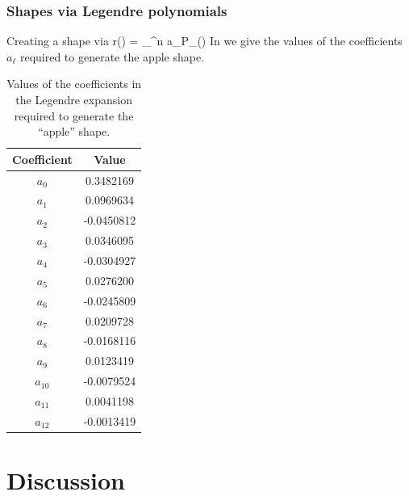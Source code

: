 \documentclass[amsmath,amssymb,12pt,eqsecnum]{revtex4}
\begin{document}
\subsubsection{Shapes via Legendre polynomials}
Creating a shape via
\bea
r(\theta) = \sum_{}^n a_{\ell}P_{\ell}(\cos\theta)
\eea
In  we give the values of the coefficients  $a_{\ell}$ required to generate the apple shape.
\begin{table}[!t]
\label{tab:priors}
\begin{center}
\begin{tabular}{|c|c|}  \hline 
Coefficient & Value \\ \hline 
$a_0$ & 0.3482169\\ \hline  
$a_1$ & 0.0969634 \\ \hline  
$a_2$ & -0.0450812 \\ \hline 
$a_3$ &  0.0346095\\ \hline 
$a_4$ & -0.0304927 \\ \hline  
$a_5$ &  0.0276200\\ \hline 
$a_6$ & -0.0245809\\ \hline 
$a_7$ & 0.0209728\\ \hline 
$a_8$ & -0.0168116\\ \hline  
$a_9$ & 0.0123419\\ \hline  
$a_{10}$ & -0.0079524\\ \hline  
$a_{11}$ & 0.0041198\\ \hline  
$a_{12}$ & -0.0013419\\ \hline   
\end{tabular}
\end{center}
\caption{Values of the coefficients in the Legendre expansion required to generate the ``apple'' shape.}
\label{apple_coeffs}
\end{table}%
\section{Discussion}
 
\end{document}
